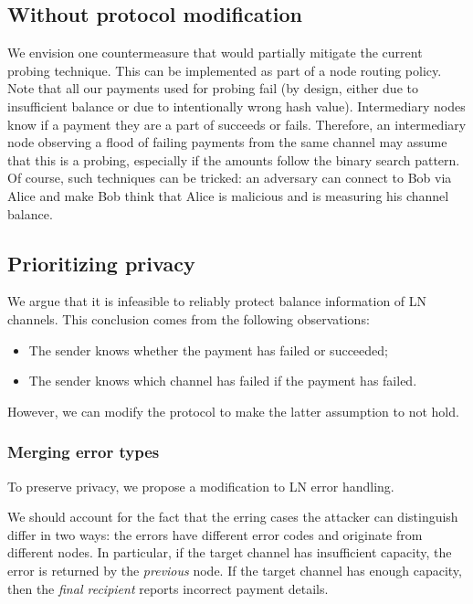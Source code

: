 \subsection{Without protocol modification}
We envision one countermeasure that would partially mitigate the current probing technique.
This can be implemented as part of a node routing policy.
Note that all our payments used for probing fail (by design, either due to insufficient balance or due to intentionally wrong hash value). 
Intermediary nodes know if a payment they are a part of succeeds or fails.
Therefore, an intermediary node observing a flood of failing payments from the same channel may assume that this is a probing, especially if the amounts follow the binary search pattern.
Of course, such techniques can be tricked: an adversary can connect to Bob via Alice and make Bob think that Alice is malicious and is measuring his channel balance.


\subsection{Prioritizing privacy}

We argue that it is infeasible to reliably protect balance information of LN channels.
This conclusion comes from the following observations:
\begin{itemize}
	\item The sender knows whether the payment has failed or succeeded;
	\item The sender knows which channel has failed if the payment has failed.
\end{itemize}

However, we can modify the protocol to make the latter assumption to not hold.

\subsubsection*{Merging error types}
To preserve privacy, we propose a modification to LN error handling.

We should account for the fact that the erring cases the attacker can distinguish differ in two ways: the errors have different error codes and originate from different nodes.
In particular, if the target channel has insufficient capacity, the error is returned by the \textit{previous} node.
If the target channel has enough capacity, then the \textit{final recipient} reports incorrect payment details.


